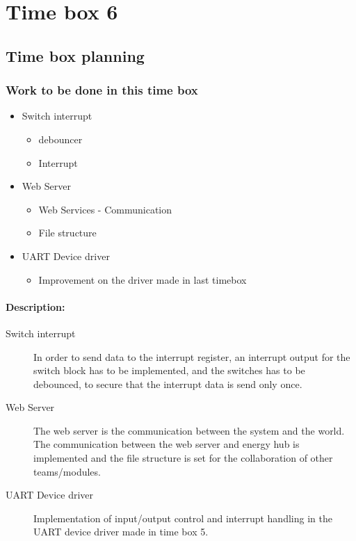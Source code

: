 \section{Time box 6}
\subsection{Time box planning}

\begin{figure}[H]
	\begin{centering}
	\end{centering}
\end{figure}

\subsubsection{Work to be done in this time box}
\begin{itemize}
	\item Switch interrupt
	\begin{itemize}
		\item debouncer
		\item Interrupt
	\end{itemize}
	\item Web Server
		\begin{itemize}
			\item Web Services - Communication
			\item File structure
		\end{itemize}
	\item UART Device driver
	\begin{itemize}
		\item Improvement on the driver made in last timebox
	\end{itemize}
\end{itemize}

\paragraph{Description:}
\begin{description}
	\item[Switch interrupt] In order to send data to the interrupt register, an interrupt output for the switch block has to be implemented, and the switches has to be debounced, to secure that the interrupt data is send only once.
	\item[Web Server] The web server is the communication between the system and the world. The communication between the web server and energy hub is implemented and the file structure is set for the collaboration of other teams/modules.
	\item[UART Device driver] Implementation of input/output control and interrupt handling in the UART device driver made in time box 5.
\end{description}


